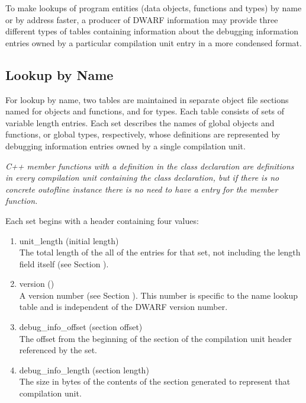 To make lookups of program entities (data objects, functions
and types) by name or by address faster, a producer of DWARF
information may provide three different types of tables
containing information about the debugging information
entries owned by a particular compilation unit entry in a
more condensed format.

\subsection{Lookup by Name}

For lookup by name, 
two tables are maintained in separate
object file sections named 
 for objects and
functions, and 
for types. Each table consists
of sets of variable length entries. Each set describes the
names of global objects and functions, or global types,
respectively, whose definitions are represented by debugging
information entries owned by a single compilation unit.

\textit{C++ member functions with a definition in the class declaration
are definitions in every compilation unit containing the
class declaration, but if there is no concrete out\dash of\dash line
instance there is no need to have a 
 entry
for the member function.}

Each set begins with a header containing four values:
\begin{enumerate}[1. ]

\item unit\_length (initial length) \\
The total length of the all of the entries for that set,
not including the length field itself 
(see Section ).

\item  version () \\
A version number
(see Section ). 
This number is specific
to the name lookup table and is independent of the DWARF
version number.

\item debug\_info\_offset (section offset) \\
The 
offset 
from the beginning of the 
 section of
the compilation unit header referenced by the set.

\item debug\_info\_length (section length) \\
The 
size in bytes of the contents of the 
 section
generated to represent that compilation unit.
\end{enumerate}

